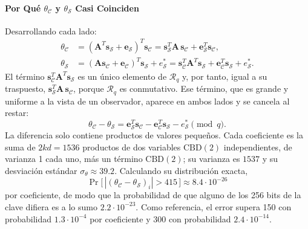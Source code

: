 \paragraph{Por Qué $\theta_{\mathcal{C}}$ y $\theta_{\mathcal{S}}$ Casi Coinciden}
Desarrollando cada lado:
\begin{align}
\theta_{\mathcal{C}} &= (\mathbf{A}^{T}\mathbf{s}_{\mathcal{S}} + \mathbf{e}_{\mathcal{S}})^{T}\mathbf{s}_{\mathcal{C}}
= \mathbf{s}_{\mathcal{S}}^{T}\mathbf{A}\,\mathbf{s}_{\mathcal{C}} + \mathbf{e}_{\mathcal{S}}^{T}\mathbf{s}_{\mathcal{C}}, \\
\theta_{\mathcal{S}} &= (\mathbf{A}\mathbf{s}_{\mathcal{C}} + \mathbf{e}_{\mathcal{C}})^{T}\mathbf{s}_{\mathcal{S}} + e^{\ast}_{\mathcal{S}}
= \mathbf{s}_{\mathcal{C}}^{T}\mathbf{A}^{T}\mathbf{s}_{\mathcal{S}} + \mathbf{e}_{\mathcal{C}}^{T}\mathbf{s}_{\mathcal{S}} + e^{\ast}_{\mathcal{S}} .
\end{align}
El término $\mathbf{s}_{\mathcal{C}}^{T}\mathbf{A}^{T}\mathbf{s}_{\mathcal{S}}$ es un único elemento de $\mathcal{R}_q$ y, por tanto, igual a su traspuesto, $\mathbf{s}_{\mathcal{S}}^{T}\mathbf{A}\,\mathbf{s}_{\mathcal{C}}$, porque $\mathcal{R}_q$ es conmutativo. Ese término, que es grande y uniforme a la vista de un observador, aparece en ambos lados y se cancela al restar:
\begin{equation}
\theta_{\mathcal{C}} - \theta_{\mathcal{S}} = \mathbf{e}_{\mathcal{S}}^{T}\mathbf{s}_{\mathcal{C}} - \mathbf{e}_{\mathcal{C}}^{T}\mathbf{s}_{\mathcal{S}} - e^{\ast}_{\mathcal{S}} \pmod q .
\end{equation}
La diferencia solo contiene productos de valores pequeños. Cada coeficiente es la suma de $2kd = 1536$ productos de dos variables $\mathrm{CBD}(2)$ independientes, de varianza 1 cada uno, más un término $\mathrm{CBD}(2)$; su varianza es $1537$ y su desviación estándar $\sigma_{\theta} \approx 39.2$. Calculando su distribución exacta,
\begin{equation}
\Pr\big[\,|(\theta_{\mathcal{C}} - \theta_{\mathcal{S}})_i| > 415\,\big] \approx 8.4 \cdot 10^{-26}
\end{equation}
por coeficiente, de modo que la probabilidad de que alguno de los 256 bits de la clave difiera es a lo sumo $2.2 \cdot 10^{-23}$. Como referencia, el error supera 150 con probabilidad $1.3 \cdot 10^{-4}$ por coeficiente y 300 con probabilidad $2.4 \cdot 10^{-14}$.

